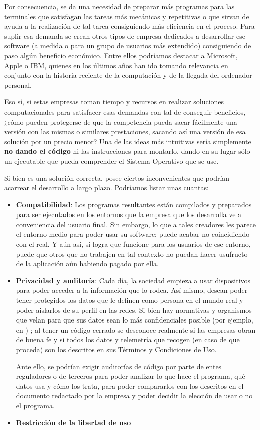 Por consecuencia, se da una necesidad de preparar más programas para las terminales que satisfagan las tareas más mecánicas y repetitivas o que sirvan de ayuda a la realización de tal tarea consiguiendo más eficiencia en el proceso. Para suplir esa demanda se crean otros tipos de empresa dedicados a desarrollar ese software (a medida o para un grupo de usuarios más extendido) consiguiendo de paso algún beneficio económico. Entre ellos podríamos destacar a Microsoft, Apple o IBM, quienes en los últimos años han ido tomando relevancia en conjunto con la historia reciente de la computación y de la llegada del ordenador personal.

Eso sí, si estas empresas toman tiempo y recursos en realizar soluciones computacionales para satisfacer esas demandas con tal de conseguir beneficios, ¿cómo pueden protegerse de que la competencia pueda sacar fácilmente una versión con las mismas o similares prestaciones, sacando así una versión de esa solución por un precio menor? Una de las ideas más intuitivas sería simplemente \textbf{no dando el código} ni las instrucciones para montarlo, dando en su lugar sólo un ejecutable que pueda comprender el Sistema Operativo que se use. 

Si bien es una solución correcta, posee ciertos inconvenientes que podrían acarrear el desarrollo a largo plazo. Podríamos listar unas cuantas:

\begin{itemize}
	\item \textbf{Compatibilidad}: Los programas resultantes están compilados y preparados para ser ejecutados en los entornos que la empresa que los desarrolla ve a conveniencia del usuario final. Sin embargo, lo que a tales creadores les parece el entorno medio para poder usar su software; puede acabar no coincidiendo con el real. Y aún así, si logra que funcione para los usuarios de ese entorno, puede que otros que no trabajen en tal contexto no puedan hacer usufructo de la aplicación aún habiendo pagado por ella.
	
	\item \textbf{Privacidad y auditoría}: Cada día, la sociedad empieza a usar dispositivos para poder acceder a la información que lo rodea. Así mismo, desean poder tener protegidos los datos que le definen como persona en el mundo real y poder aislarlos de su perfil en las redes. Si bien hay normativas y organismos que velan para que sus datos sean lo más confidenciales posible (por ejemplo, en \cite{lopd-2018}) ; al tener un código cerrado se desconoce realmente si las empresas obran de buena fe y si todos los datos y telemetría que recogen (en caso de que proceda) son los descritos en sus Términos y Condiciones de Uso.
	
	Ante ello, se podrían exigir auditorías de código por parte de entes reguladores o de terceros para poder analizar lo que hace el programa, qué datos usa y cómo los trata, para poder compararlos con los descritos en el documento redactado por la empresa y poder decidir la elección de usar o no el programa.
	
	\item \textbf{Restricción de la libertad de uso}
\end{itemize}

